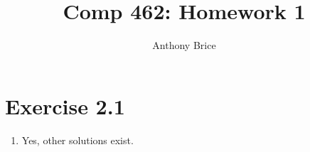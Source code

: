 \documentclass{abrice}
\title{Comp 462: Homework 1}
\author{Anthony Brice}
\begin{document}
\maketitle

\section{Exercise 2.1}
\begin{enumerate}[label=(\alph*)]
\item Yes, other solutions exist.
\end{enumerate}
\end{document}
